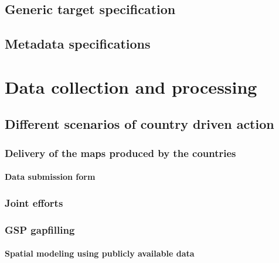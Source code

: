 \documentclass[
  10pt,
  b5paper,
  oneside]{book}
\theoremstyle{definition}
\theoremstyle{definition}
\theoremstyle{definition}
\theoremstyle{definition}
\theoremstyle{remark}
\begin{document}
\hypertarget{generic-target-specification}{%
\section{Generic target specification}\label{generic-target-specification}}

\hypertarget{metadata-specifications}{%
\section{Metadata specifications}\label{metadata-specifications}}

\hypertarget{data-collection-and-processing}{%
\chapter{Data collection and processing}\label{data-collection-and-processing}}

\hypertarget{different-scenarios-of-country-driven-action}{%
\section{Different scenarios of country driven action}\label{different-scenarios-of-country-driven-action}}

\hypertarget{delivery-of-the-maps-produced-by-the-countries}{%
\subsection{Delivery of the maps produced by the countries}\label{delivery-of-the-maps-produced-by-the-countries}}

\hypertarget{data-submission-form}{%
\subsubsection{Data submission form}\label{data-submission-form}}

\hypertarget{joint-efforts}{%
\subsection{Joint efforts}\label{joint-efforts}}

\hypertarget{gsp-gapfilling}{%
\subsection{GSP gapfilling}\label{gsp-gapfilling}}

\hypertarget{spatial-modeling-using-publicly-available-data}{%
\subsubsection{Spatial modeling using publicly available data}\label{spatial-modeling-using-publicly-available-data}}
\end{document}
